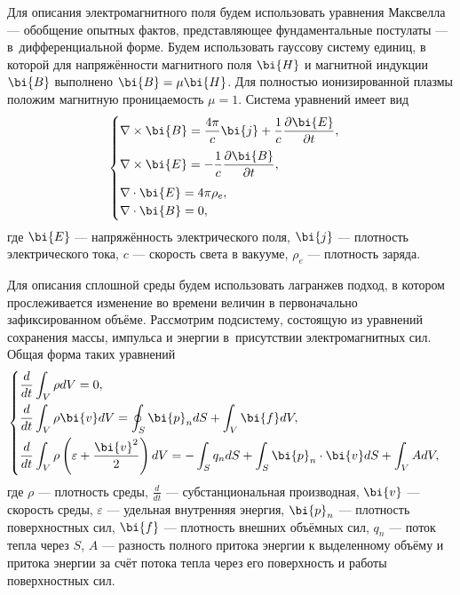 \documentclass[12pt, a4paper]{article}
\begin{document}
	Для описания электромагнитного поля будем использовать уравнения Максвелла --- обобщение опытных фактов, представляющее фундаментальные постулаты --- в~дифференциальной форме. Будем использовать гауссову систему единиц, в которой для напряжённости магнитного поля $\bi{H}$ и магнитной индукции $\bi{B}$ выполнено $\bi{B} = \mu \bi{H}$. Для полностью ионизированной плазмы положим магнитную проницаемость $\mu = 1$. Система уравнений имеет вид \cite{Kulikovskiy}
	\begin{equation}
	\label{Maxwell}
	\begin{cases}
		\nabla \times \bi{B} = \dfrac{4\pi}{c}\bi{j} + \dfrac1c \dfrac{\partial \bi{E}}{\partial t}, \\[3mm]
		\nabla \times \bi{E} =  -\dfrac1c \dfrac{\partial \bi{B}}{\partial t}, \\[3mm]
		\nabla \cdot \bi{E} = 4\pi\rho_{e}, \\
		\nabla \cdot \bi{B} = 0,
	\end{cases}
	\end{equation}
	где $\bi{E}$ --- напряжённость электрического поля, $\bi{j}$ --- плотность электрического тока, $c$ --- скорость света в вакууме, $\rho_e$ --- плотность заряда.
	
	Для описания сплошной среды будем использовать лагранжев подход, в котором прослеживается изменение во времени величин в первоначально зафиксированном объёме. Рассмотрим подсистему, состоящую из уравнений сохранения массы, импульса и энергии в~присутствии электромагнитных сил. Общая форма таких уравнений 
	\begin{equation}
	\label{Movement}
	\begin{cases}
	\displaystyle	\dfrac{d}{dt} \int_V \rho dV = 0, \\[3mm]
	\displaystyle	\dfrac{d}{dt} \int_V \rho\bi{v} dV = \oint_S \bi{p}_n dS + \int_V \bi{f} dV, \\[3mm]
	\displaystyle \dfrac{d}{dt} \int_V \rho \left(\varepsilon + \frac{\bi{v}^2}{2}\right) dV = -\int_S q_n dS + \int_S \bi{p}_n \cdot \bi{v} dS + \int_V A dV,
	\end{cases}
	\end{equation}
	где $\rho$ --- плотность среды, $\frac{d}{dt}$ --- субстанциональная производная, $\bi{v}$ --- скорость среды, $\varepsilon$ --- удельная внутренняя энергия, $\bi{p}_n$ --- плотность поверхностных сил, $\bi{f}$ --- плотность внешних объёмных сил, $q_n$ --- поток тепла через $S$, $A$ --- разность полного притока энергии к выделенному объёму и притока энергии за счёт потока тепла через его поверхность и работы поверхностных сил.
	
\end{document}
